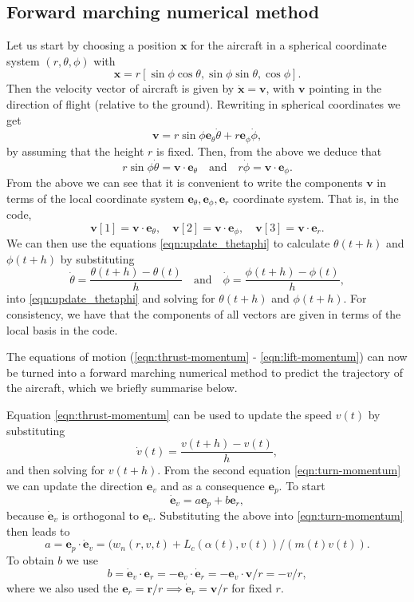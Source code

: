 \documentclass{article}
\renewcommand{\vec}[1]{\boldsymbol{#1}}
\begin{document}
\subsection{Forward marching numerical method}

Let us start by choosing a position $\vec x$ for the aircraft in a spherical coordinate system $(r,\theta,\phi)$ with
\[
\vec x = r [ \sin \phi \cos \theta, \sin \phi \sin \theta,   \cos \phi].
\]
Then the velocity vector of aircraft is given by $\dot{\vec x} = \vec v$, with $\vec v$ pointing in the direction of flight (relative to the ground). Rewriting in spherical coordinates we get
\[
\vec v = r \sin \phi  {\vec e_\theta} \dot \theta + r  {\vec e_\phi} \dot \phi, 
\]
by assuming that the height $r$ is fixed. Then, from the above we deduce that
\begin{equation} \label{eqn:update_thetaphi}
    r \sin \phi \dot \theta = \vec v \cdot {\vec e}_\theta  \quad \text{and} \quad 
r \dot \phi = \vec v \cdot {\vec e}_\phi.
\end{equation}
From the above we can see that it is convenient to write the components $\vec v$ in terms of the local coordinate system ${\vec e}_\theta, {\vec e}_\phi, {\vec e}_r$ coordinate system. That is, in the code, 
\[
\vec v[1] = \vec v \cdot {\vec e}_\theta, \quad 
\vec v[2] = \vec v \cdot {\vec e}_\phi, 
\quad 
\vec v[3] = \vec v \cdot {\vec e}_r.
\]
We can then use the equations \eqref{eqn:update_thetaphi}  to calculate $\theta(t+h)$ and $\phi(t+h)$ by substituting 
\[
\dot \theta = \frac{ \theta(t+h) - \theta(t)}{h} \quad \text{and} \quad 
\dot \phi = \frac{ \phi(t+h) - \phi(t)}{h},
\]
into \eqref{eqn:update_thetaphi} and solving for $\theta(t+h)$ and $\phi(t+h)$. For consistency, we have that the components of all vectors are given in terms of the local basis in the code.

The equations of motion (\ref{eqn:thrust-momentum} - \ref{eqn:lift-momentum}) can now be turned into a forward marching numerical method to predict the trajectory of the aircraft, which we briefly summarise below.

Equation \eqref{eqn:thrust-momentum} can be used to update the speed $v(t)$ by substituting
\[
\dot { v}(t) = \frac{{v}(t+h) - {v}(t)}{h},
\]
and then solving for ${v}(t+h)$. From the second equation \eqref{eqn:turn-momentum} we can update the direction $\vec {e}_v$ and as a consequence $\vec e_p$. To start
\[
\dot{\vec e}_v = a {\vec e}_p + b {\vec e}_r, 
\]
because $\dot {\vec e}_v$ is orthogonal to ${\vec e}_v$. Substituting the above into \eqref{eqn:turn-momentum} then leads to
\begin{equation}
 a =  {\vec{e}}_p \cdot \dot{\vec{e}}_v =  (w_n(r,v,t) + L_c(\alpha(t),v(t) ) / (m(t) v(t)).
\end{equation}
To obtain $b$ we use 
\begin{equation}
b = \dot{\vec e}_v \cdot  {\vec e}_r = - {\vec e}_v \cdot  \dot {\vec e}_r =  - {\vec e}_v \cdot  {\vec v} / r = - v / r,    
\end{equation}
where we also used the $\vec e_r = \vec r / r \implies \dot{\vec e}_r = \vec v / r$ for fixed $r$.
\end{document}
